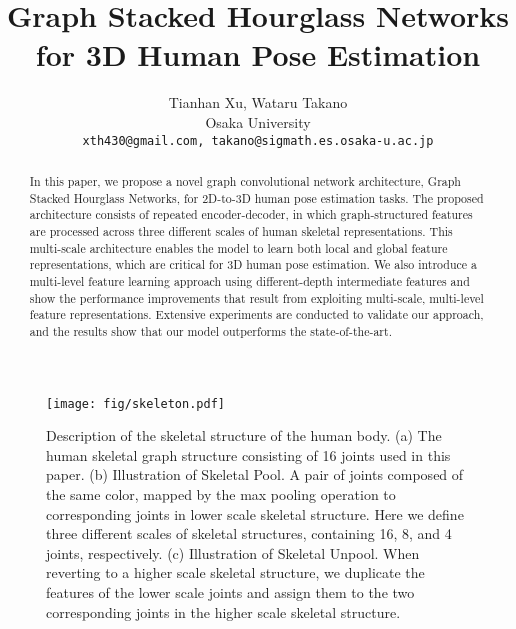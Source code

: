 \documentclass[final]{cvpr}
\begin{document}
\title{Graph Stacked Hourglass Networks for 3D Human Pose Estimation}

\author{Tianhan Xu, \quad Wataru Takano\\
Osaka University\\
{\tt\small xth430@gmail.com, takano@sigmath.es.osaka-u.ac.jp}
}

\maketitle

\begin{abstract}

   In this paper, we propose a novel graph convolutional network architecture, Graph Stacked Hourglass Networks, for 2D-to-3D human pose estimation tasks. The proposed architecture consists of repeated encoder-decoder, in which graph-structured features are processed across three different scales of human skeletal representations. This multi-scale architecture enables the model to learn both local and global feature representations, which are critical for 3D human pose estimation. We also introduce a multi-level feature learning approach using different-depth intermediate features and show the performance improvements that result from exploiting multi-scale, multi-level feature representations. Extensive experiments are conducted to validate our approach, and the results show that our model outperforms the state-of-the-art.

\end{abstract}

\begin{figure*}
\begin{center}
\texttt{[image: fig/skeleton.pdf]}
\end{center}
   \caption{Description of the skeletal structure of the human body. 
   (a) The human skeletal graph structure consisting of 16 joints used in this paper.
   (b) Illustration of Skeletal Pool. A pair of joints composed of the same color, mapped by the max pooling operation to corresponding joints in lower scale skeletal structure.
   Here we define three different scales of skeletal structures, containing 16, 8, and 4 joints, respectively.
   (c) Illustration of Skeletal Unpool. When reverting to a higher scale skeletal structure, we duplicate the features of the lower scale joints and assign them to the two corresponding joints in the higher scale skeletal structure.}
\label{fig:skeleton}
\end{figure*}
\end{document}

